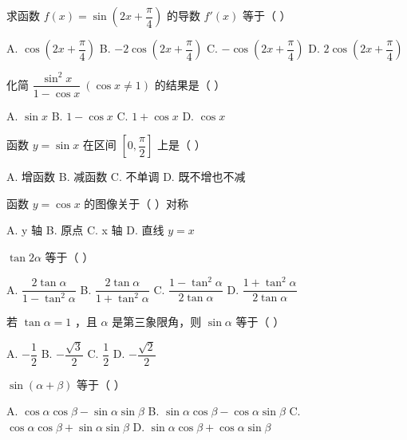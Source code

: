 \documentclass[11pt, a4paper]{article}
\begin{document}
\begin{baitap}[6]
求函数 $f(x) = \sin\!\left(2x + \dfrac{\pi}{4}\right)$ 的导数 $f'(x)$ 等于（ ）
\par\vspace{3pt}
\noindent A. $\cos\!\left(2x + \dfrac{\pi}{4}\right)$ \quad B. $-2\cos\!\left(2x + \dfrac{\pi}{4}\right)$ \quad C. $-\cos\!\left(2x + \dfrac{\pi}{4}\right)$ \quad D. $2\cos\!\left(2x + \dfrac{\pi}{4}\right)$
\end{baitap}

\begin{baitap}[7]
化简 $\dfrac{\sin^2 x}{1 - \cos x}\ (\cos x \ne 1)$ 的结果是（ ）
\par\vspace{3pt}
\noindent A. $\sin x$ \quad B. $1 - \cos x$ \quad C. $1 + \cos x$ \quad D. $\cos x$
\end{baitap}

\begin{baitap}[8]
函数 $y = \sin x$ 在区间 $\left[0, \dfrac{\pi}{2}\right]$ 上是（ ）
\par\vspace{3pt}
\noindent A. 增函数 \quad B. 减函数 \quad C. 不单调 \quad D. 既不增也不减
\end{baitap}

\begin{baitap}[9]
函数 $y = \cos x$ 的图像关于（ ）对称
\par\vspace{3pt}
\noindent A. y 轴 \quad B. 原点 \quad C. x 轴 \quad D. 直线 $y = x$
\end{baitap}

\begin{baitap}[10]
$\tan 2\alpha$ 等于（ ）
\par\vspace{3pt}
\noindent A. $\dfrac{2\tan\alpha}{1-\tan^2\alpha}$ \quad B. $\dfrac{2\tan\alpha}{1+\tan^2\alpha}$ \quad C. $\dfrac{1-\tan^2\alpha}{2\tan\alpha}$ \quad D. $\dfrac{1+\tan^2\alpha}{2\tan\alpha}$
\end{baitap}

\begin{baitap}[11]
若 $\tan\alpha = 1$ ，且 $\alpha$ 是第三象限角，则 $\sin\alpha$ 等于（ ）
\par\vspace{3pt}
\noindent A. $-\dfrac{1}{2}$ \quad B. $-\dfrac{\sqrt{3}}{2}$ \quad C. $\dfrac{1}{2}$ \quad D. $-\dfrac{\sqrt{2}}{2}$
\end{baitap}

\begin{baitap}[12]
$\sin(\alpha + \beta)$ 等于（ ）
\par\vspace{3pt}
\noindent A. $\cos\alpha \cos\beta - \sin\alpha \sin\beta$ \quad B. $\sin\alpha \cos\beta - \cos\alpha \sin\beta$ \quad C. $\cos\alpha \cos\beta + \sin\alpha \sin\beta$ \quad D. $\sin\alpha \cos\beta + \cos\alpha \sin\beta$
\end{baitap}
\end{document}
